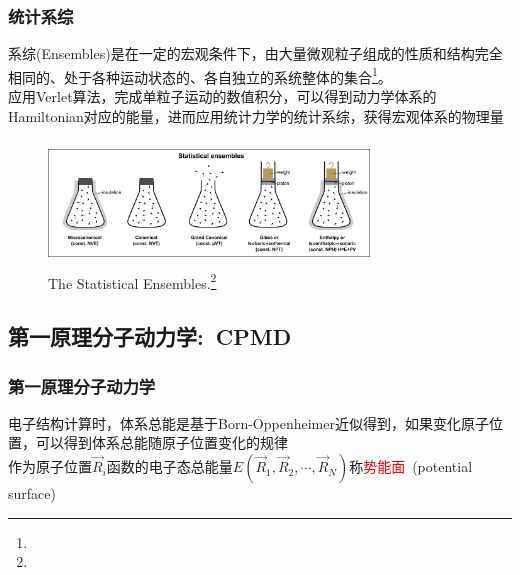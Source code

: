 {\frame
{
	\frametitle{统计系综}
	系综(\textrm{Ensembles})是在一定的宏观条件下，由大量微观粒子组成的性质和结构完全相同的、处于各种运动状态的、各自独立的系统整体的集合\footnote{\fontsize{4.2pt}{2.2pt}}。\\
	应用\textrm{Verlet}算法，完成单粒子运动的数值积分，可以得到动力学体系的\textrm{Hamiltonian}对应的能量，进而应用统计力学的统计系综，获得宏观体系的物理量
\begin{figure}[h!]
\centering
\vspace*{-0.20in}
\includegraphics[height=1.30in,width=3.35in,viewport=0 0 1420 570,clip]{Figures/Statistical_Ensembles.png}
\caption{\tiny \textrm{The Statistical Ensembles.\footnote{\fontsize{3.5pt}{1.2pt}}}}%
\label{Statistical_Ensemble-2}
\end{figure}
}

\subsection{第一原理分子动力学:~{\rm CPMD}}
\frame
{
	\frametitle{第一原理分子动力学}
	电子结构计算时，体系总能是基于\textrm{Born-Oppenheimer}近似得到，如果变化原子位置，可以得到体系总能随原子位置变化的规律\\
	作为原子位置$\vec R_i$函数的电子态总能量$E(\vec R_1,\vec R_2,\cdots,\vec R_N)$称\textcolor{red}{势能面}~(\textrm{potential surface})

}}
